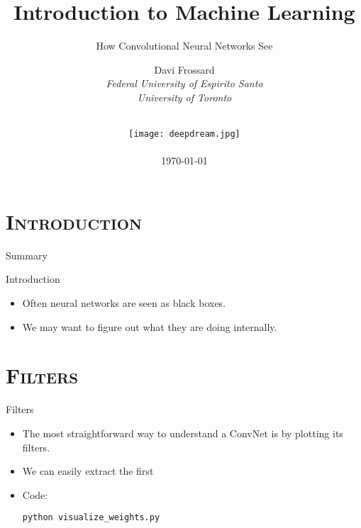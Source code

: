 


\section{\scshape Introduction}
\begin{frame}
	\title{Introduction to Machine Learning}
	\subtitle{How Convolutional Neural Networks See}
	\author{
		Davi Frossard\\
		{\it Federal University of Espirito Santo \\ University of Toronto}\\
	}
	\date{
		\vspace{-2em}\\
		\texttt{[image: deepdream.jpg]}\\[-1ex]
		\\
		\today
	}
	\titlepage
\end{frame}

\begin{frame}{Summary}
	\tableofcontents
\end{frame}

\begin{frame}{Introduction}
	\begin{itemize}
		\item Often neural networks are seen as black boxes.
		\item We may want to figure out what they are doing internally.
	\end{itemize}
\end{frame}

\section{\scshape Filters}
\begin{frame}{Filters}
	\begin{itemize}
		\item The most straightforward way to understand a ConvNet is by plotting its filters.
		\item We can easily extract the first
		\item<1-> Code:
		\begin{center}
			{\smaller \texttt{python visualize\_weights.py}}
		\end{center}
	\end{itemize}
\end{frame}

